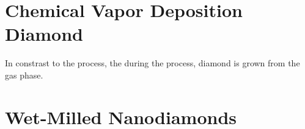	\section{Chemical Vapor Deposition Diamond}

	In constrast to the \HPHT process, the during the \cvd process, diamond is grown from the gas phase. 

	\section{Wet-Milled Nanodiamonds}
